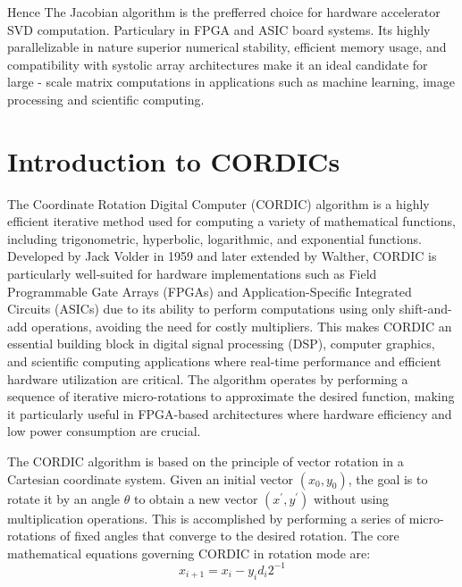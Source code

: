 Hence The Jacobian algorithm is the prefferred choice for hardware accelerator SVD computation. Particulary in FPGA and ASIC board systems\cite{svd-hardware-5}. Its highly parallelizable in nature superior numerical stability, efficient memory usage, and compatibility with systolic array architectures make it an ideal candidate for large - scale matrix computations in applications such as machine learning, image processing and scientific computing. 


\section{Introduction to CORDICs}
The Coordinate Rotation Digital Computer (CORDIC) algorithm is a highly efficient iterative method used for computing a variety of mathematical functions, including trigonometric, hyperbolic, logarithmic, and exponential functions. Developed by Jack Volder in 1959\cite{cordic-3} and later extended by Walther, CORDIC is particularly well-suited for hardware implementations such as Field Programmable Gate Arrays (FPGAs) and Application-Specific Integrated Circuits (ASICs) due to its ability to perform computations using only shift-and-add operations, avoiding the need for costly multipliers. This makes CORDIC an essential building block in digital signal processing (DSP), computer graphics, and scientific computing applications where real-time performance and efficient hardware utilization are critical. The algorithm operates by performing a sequence of iterative micro-rotations to approximate the desired function, making it particularly useful in FPGA-based architectures where hardware efficiency and low power consumption are crucial\cite{cordic-1}.

The CORDIC algorithm is based on the principle of vector rotation in a Cartesian coordinate system. Given an initial vector \( (x_{0}, y_{0}) \), the goal is to rotate it by an angle \( \theta \) to obtain a new vector \( (x^{'}, y^{'}) \) without using multiplication operations. This is accomplished by performing a series of micro-rotations of fixed angles that converge to the desired rotation. The core mathematical equations governing CORDIC in rotation mode are:
\begin{equation}
	\label{eq:equation_3}
	x_{i+1} = x_{i} - y_{i}d_{i}2^{-1}
\end{equation}

